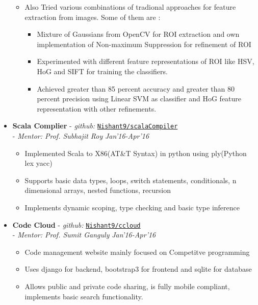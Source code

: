 \documentclass[a4paper,9pt]{extarticle}
\begin{document}
\begin{itemize}
\begin{itemize}
          \item Also Tried various combinations of tradional approaches for
            feature extraction from images.
            Some of them are :
            \begin{itemize}
          \item Mixture of Gaussians from OpenCV for ROI extraction and own
            implementation of Non-maximum Suppression for refinement of ROI
          \item Experimented with different feature representations of ROI like
            HSV, HoG and SIFT for training the classifiers.
          \item Achieved greater than 85 percent accuracy and greater than 80
            percent precision using Linear SVM as classifier and HoG feature
            representation with other refinements.
            \end{itemize}
          \end{itemize}
          
        \item \textbf{Scala Complier} - \textit{github:}
          \href{http://www.github.com/Nishant9/scalaCompiler}{\texttt{Nishant9/scalaCompiler}}
          \\ - \textit{Mentor: Prof. Subhajit Roy} \hfill \textit{Jan'16-Apr'16}
          \vspace{-2mm}\begin{itemize} \itemsep -2pt
          \item Implemented Scala to X86(AT\&T Syntax) in python using
            ply(Python lex yacc)
          \item Supports basic data types, loops, switch statements,
            conditionals, n dimensional arrays, nested functions, recursion
          \item Implements dynamic scoping, type checking and basic type inference  
          \end{itemize}
          
        \item \textbf{Code Cloud} - \textit{github:} \href{http://www.github.com/Nishant9/ccloud}{\texttt{Nishant9/ccloud}} 
          \\ - \textit{Mentor: Prof. Sumit Ganguly} \hfill \textit{Jan'16-Apr'16}
          \vspace{-2mm}\begin{itemize} \itemsep -2pt
          \item Code management website mainly focused on Competitve programming
          \item Uses django for backend, bootstrap3 for frontend and sqlite for database
          \item Allows public and private code sharing, is fully mobile
            compliant, implements basic search functionality.  
          \end{itemize}
          

\end{itemize}
\end{document}
